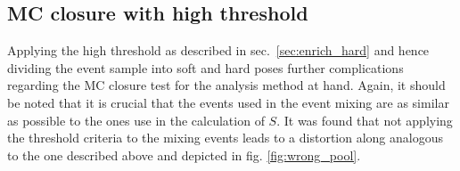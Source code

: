 \subsection[MC closure with high \pt threshold]{MC closure with high \ptbold threshold}
\label{sec:closure_with_thresh}

Applying the high \pt threshold \ptthresh as described in sec.~\ref{sec:enrich_hard} and hence dividing the event sample into \gls{soft} and \gls{hard} poses further complications regarding the MC closure test for the analysis method at hand. Again, it should be noted that it is crucial that the events used in the event mixing are as similar as possible to the ones use in the calculation of $S$. It was found that not applying the threshold criteria to the mixing events leads to a distortion along \deta analogous to the one described above and depicted in fig. \ref{fig:wrong_pool}. 

